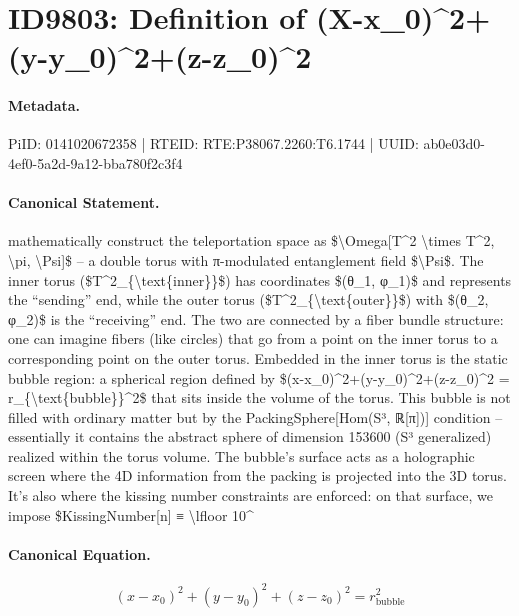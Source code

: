 \section*{ID9803: Definition of (X-x\_0)\textasciicircum{}2+(y-y\_0)\textasciicircum{}2+(z-z\_0)\textasciicircum{}2}
\paragraph{Metadata.}
PiID: 0141020672358 | RTEID: RTE:P38067.2260:T6.1744 | UUID: ab0e03d0-4ef0-5a2d-9a12-bba780f2c3f4

\paragraph{Canonical Statement.}
mathematically construct the teleportation space as \$\textbackslash{}Omega[T\textasciicircum{}2 \textbackslash{}times T\textasciicircum{}2, \textbackslash{}pi, \textbackslash{}Psi]\$ – a double torus with π-modulated entanglement field \$\textbackslash{}Psi\$. The inner torus (\$T\textasciicircum{}2\_\{\textbackslash{}text\{inner\}\}\$) has coordinates \$(θ\_1, φ\_1)\$ and represents the “sending” end, while the outer torus (\$T\textasciicircum{}2\_\{\textbackslash{}text\{outer\}\}\$) with \$(θ\_2, φ\_2)\$ is the “receiving” end. The two are connected by a fiber bundle structure: one can imagine fibers (like circles) that go from a point on the inner torus to a corresponding point on the outer torus. Embedded in the inner torus is the static bubble region: a spherical region defined by \$(x-x\_0)\textasciicircum{}2+(y-y\_0)\textasciicircum{}2+(z-z\_0)\textasciicircum{}2 = r\_\{\textbackslash{}text\{bubble\}\}\textasciicircum{}2\$ that sits inside the volume of the torus. This bubble is not filled with ordinary matter but by the PackingSphere[Hom(S³, ℝ[π])] condition – essentially it contains the abstract sphere of dimension 153600 (S³ generalized) realized within the torus volume. The bubble’s surface acts as a holographic screen where the 4D information from the packing is projected into the 3D torus. It’s also where the kissing number constraints are enforced: on that surface, we impose \$KissingNumber[n] ≡ \textbackslash{}lfloor 10\textasciicircum{}

\paragraph{Canonical Equation.}
\[
(x-x_0)^2+(y-y_0)^2+(z-z_0)^2 = r_{\text{bubble}}^2
\]

